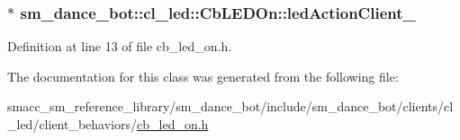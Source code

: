 \subsubsection[{\texorpdfstring{led\+Action\+Client\+\_\+}{ledActionClient_}}]{$\ast$ sm\+\_\+dance\+\_\+bot\+::cl\+\_\+led\+::\+Cb\+L\+E\+D\+On\+::led\+Action\+Client\+\_\+}\hypertarget{classsm__dance__bot_1_1cl__led_1_1CbLEDOn_a1ee516ed1a051922f804818ea429f2fe}{}\label{classsm__dance__bot_1_1cl__led_1_1CbLEDOn_a1ee516ed1a051922f804818ea429f2fe}


Definition at line 13 of file cb\+\_\+led\+\_\+on.\+h.



The documentation for this class was generated from the following file\+:\begin{DoxyCompactItemize}
\item 
smacc\+\_\+sm\+\_\+reference\+\_\+library/sm\+\_\+dance\+\_\+bot/include/sm\+\_\+dance\+\_\+bot/clients/cl\+\_\+led/client\+\_\+behaviors/\hyperlink{cb__led__on_8h}{cb\+\_\+led\+\_\+on.\+h}\end{DoxyCompactItemize}
